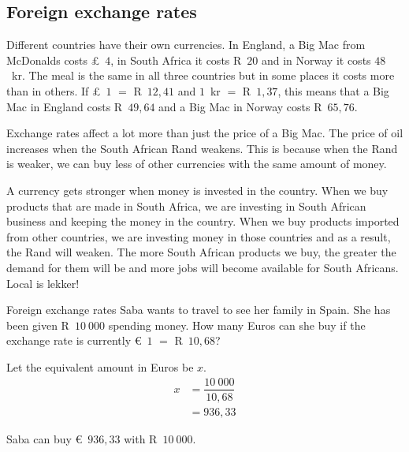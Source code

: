 \subsection{Foreign exchange rates}

Different countries have their own currencies. In England, a Big Mac
from McDonalds costs £~$4$, in South Africa it costs R~$20$ and in
Norway it costs $48$~kr. The meal is the same in all three countries
but in some places it costs more than in others. If £~$1$ $=$
R~$12,41$ and $1$~kr $=$ R~$1,37$, this means that a Big Mac in
England costs R~$49,64$ and a Big Mac in Norway costs R~$65,76$.
\par
Exchange rates affect a lot more than just the price of a Big Mac. The price of oil increases when the South African Rand weakens. This is because when the Rand is weaker, we can buy less of other currencies with the same amount of money.
\par
A currency gets stronger when money is invested in the country. When we buy products that are made in South Africa, we are investing in South African business and keeping the money in the country. When we buy products imported from other countries, we are investing money in those countries and as a result, the Rand will weaken. The more South African products we buy, the greater the demand for them will be and more jobs will become available for South Africans. Local is lekker!
\par
{}

\begin{wex}{Foreign exchange rates}
    {Saba wants to travel to see her family in Spain. She has been given R~$10~000$ spending money. How many Euros can she buy if the exchange rate is currently €~$1$ $=$ R~$10,68$?}{
Let the equivalent amount in Euros be $x$.
\begin{align*}
 x &= \dfrac{10~000}{10,68}\\
&= 936,33
\end{align*}

    Saba can buy €~$936,33$ with R~$10~000$.
}
\end{wex}


